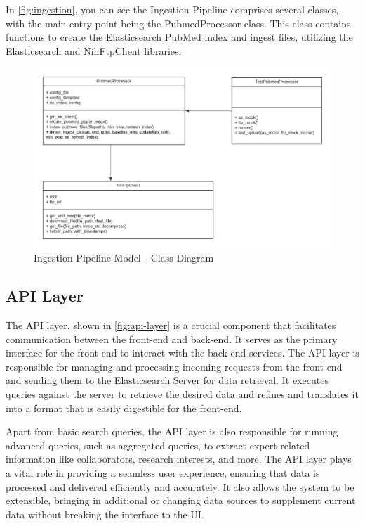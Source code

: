 In \autoref{fig:ingestion}, you can see the Ingestion Pipeline comprises several classes, with the main entry point being the PubmedProcessor class. This class contains functions to create the Elasticsearch PubMed index and ingest files, utilizing the Elasticsearch and NihFtpClient libraries.

\begin{figure}[htp]
    \centering
    \includegraphics[width=\textwidth]{Images/IngestionPipeline_ClassDiagram.png}
    \caption{Ingestion Pipeline Model - Class Diagram}
    \label{fig:ingestion}
\end{figure}



\subsection{API Layer}

The API layer, shown in \autoref{fig:api-layer} is a crucial component that facilitates communication between the front-end and back-end. It serves as the primary interface for the front-end to interact with the back-end services. The API layer is responsible for managing and processing incoming requests from the front-end and sending them to the Elasticsearch Server for data retrieval. It executes queries against the server to retrieve the desired data and refines and translates it into a format that is easily digestible for the front-end.

Apart from basic search queries, the API layer is also responsible for running advanced queries, such as aggregated queries, to extract expert-related information like collaborators, research interests, and more. The API layer plays a vital role in providing a seamless user experience, ensuring that data is processed and delivered efficiently and accurately. It also allows the system to be extensible, bringing in additional or changing data sources to supplement current data  without breaking the interface to the UI.


